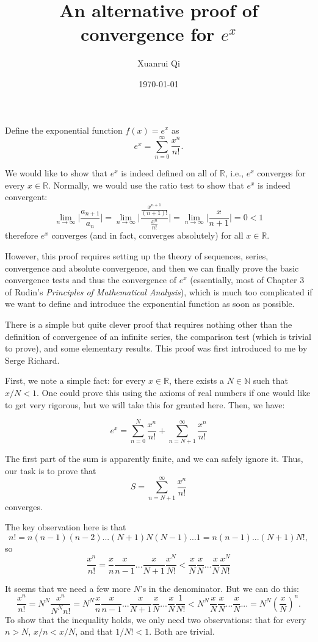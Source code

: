 \documentclass[12pt, a4paper]{article}
\title{An alternative proof of convergence for $e^x$}
\date{\today}
\author{Xuanrui Qi}
\begin{document}
\maketitle

Define the exponential function $f(x) = e^x$ as
\[
  e^x = \sum_{n = 0}^{\infty} \frac{x^n}{n!}.
\]

We would like to show that $e^x$ is indeed defined on all of $\mathbb{R}$, i.e.,
$e^x$ converges for every $x \in \mathbb{R}$. Normally, we would use the ratio test to
show that $e^x$ is indeed convergent:
\[
  \lim_{n \to \infty} \lvert \frac{a_{n+1}}{a_n} \rvert = \lim_{n \to \infty} \lvert \frac{\frac{x^{n+1}}{(n+1)!}}{\frac{x^n}{n!}} \rvert
  = \lim_{n \to \infty} \lvert \frac{x}{n+1} \rvert = 0 < 1
\]
therefore $e^x$ converges (and in fact, converges absolutely) for all $x \in \mathbb{R}$.

However, this proof requires setting up the theory of sequences, series, convergence and absolute convergence, and then we can finally
prove the basic convergence tests and thus the convergence of $e^x$ (essentially, most of Chapter 3 of Rudin's \textit{Principles of Mathematical Analysis}),
which is much too complicated if we want to define and introduce the exponential function as soon as possible.

There is a simple but quite clever proof that requires nothing other than the definition of convergence of an infinite series,
the comparison test (which is trivial to prove), and some elementary results. This proof was first introduced to me by Serge Richard.

First, we note a simple fact: for every $x \in \mathbb{R}$, there exists a $N \in \mathbb{N}$ such that $x/N < 1$. One could prove
this using the axioms of real numbers if one would like to get very rigorous, but we will take this for granted here.
Then, we have:

\[
  e^x = \sum_{n = 0}^{N} \frac{x^n}{n!} + \sum_{n = N+1}^{\infty} \frac{x^n}{n!}
\]

The first part of the sum is apparently finite, and we can safely ignore it. Thus, our task is to prove that
\[
  S = \sum_{n = N+1}^{\infty} \frac{x^n}{n!}
\]
converges.

The key observation here is that
\[
  n! = n(n-1)(n-2)...(N+1)N(N-1)...1 = n(n-1)...(N+1)N!,
\]
so
\[
  \frac{x^n}{n!} = \frac{x}{n} \frac{x}{n-1} ... \frac{x}{N+1} \frac{x^N}{N!} < \frac{x}{N} \frac{x}{N} ... \frac{x}{N} \frac{x^N}{N!}
\]

It seems that we need a few more $N$'s in the denominator. But we can do this:
\[
  \frac{x^n}{n!} = N^{N}\frac{x^n}{N^{N}n!} =  N^{N}\frac{x}{n} \frac{x}{n-1} ... \frac{x}{N+1} \frac{x}{N} ... \frac{x}{N} \frac{1}{N!} <  N^{N} \frac{x}{N} \frac{x}{N} ... \frac{x}{N} ...
  = N^N (\frac{x}{N})^n.
\]
To show that the inequality holds, we only need two observations: that for every $n > N$, $x/n < x/N$, and that $1/N! < 1$. Both are trivial.
\end{document}
